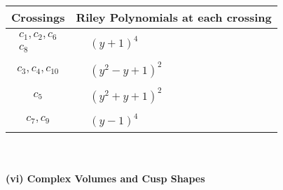 \documentclass[1p]{elsarticle_modified}
\theoremstyle{definition}
\begin{document}
\begin{tabular}{m{50pt}|m{274pt}}
Crossings & \hspace{64pt}Riley Polynomials at each crossing \\
\hline $$\begin{aligned}c_{1},c_{2},c_{6}\\c_{8}\end{aligned}$$&$\begin{aligned}
&(y+1)^4
\end{aligned}$\\
\hline $$\begin{aligned}c_{3},c_{4},c_{10}\end{aligned}$$&$\begin{aligned}
&(y^2- y+1)^2
\end{aligned}$\\
\hline $$\begin{aligned}c_{5}\end{aligned}$$&$\begin{aligned}
&(y^2+y+1)^2
\end{aligned}$\\
\hline $$\begin{aligned}c_{7},c_{9}\end{aligned}$$&$\begin{aligned}
&(y-1)^4
\end{aligned}$\\
\hline
\end{tabular}\\~\\
\newpage\flushleft \textbf{(vi) Complex Volumes and Cusp Shapes}
\end{document}

